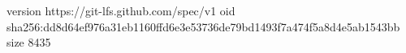 version https://git-lfs.github.com/spec/v1
oid sha256:dd8d64ef976a31eb1160ffd6e3e53736de79bd1493f7a474f5a8d4e5ab1543bb
size 8435
